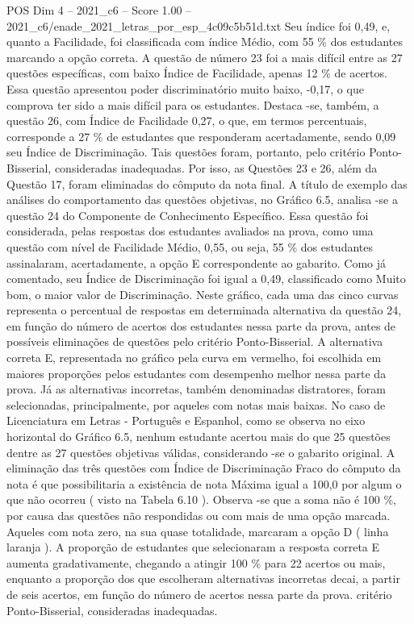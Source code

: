 \begin{textsample}{POS Dim 4 – 2021\_c6 – Score 1.00 – 2021\_c6/enade\_2021\_letras\_por\_esp\_4c09c5b51d.txt}
Seu índice foi 0,49, e, quanto a Facilidade, foi classificada com índice Médio, com 55 \% dos estudantes marcando a opção correta.
A questão de número 23 foi a mais difícil entre as 27 questões específicas, com baixo Índice de Facilidade, apenas 12 \% de acertos.
Essa questão apresentou poder discriminatório muito baixo, -0,17, o que comprova ter sido a mais difícil para os estudantes.
Destaca -se, também, a questão 26, com Índice de Facilidade 0,27, o que, em termos percentuais, corresponde a 27 \% de estudantes que responderam acertadamente, sendo 0,09 seu Índice de Discriminação.
Tais questões foram, portanto, pelo critério Ponto-Bisserial, consideradas inadequadas.
Por isso, as Questões 23 e 26, além da Questão 17, foram eliminadas do cômputo da nota final.
A título de exemplo das análises do comportamento das questões objetivas, no Gráfico 6.5, analisa -se a questão 24 do Componente de Conhecimento Específico.
Essa questão foi considerada, pelas respostas dos estudantes avaliados na prova, como uma questão com nível de Facilidade Médio, 0,55, ou seja, 55 \% dos estudantes assinalaram, acertadamente, a opção E correspondente ao gabarito.
Como já comentado, seu Índice de Discriminação foi igual a 0,49, classificado como Muito bom, o maior valor de Discriminação.
Neste gráfico, cada uma das cinco curvas representa o percentual de respostas em determinada alternativa da questão 24, em função do número de acertos dos estudantes nessa parte da prova, antes de possíveis eliminações de questões pelo critério Ponto-Bisserial.
A alternativa correta E, representada no gráfico pela curva em vermelho, foi escolhida em maiores proporções pelos estudantes com desempenho melhor nessa parte da prova.
Já as alternativas incorretas, também denominadas distratores, foram selecionadas, principalmente, por aqueles com notas mais baixas.
No caso de Licenciatura em Letras - Português e Espanhol, como se observa no eixo horizontal do Gráfico 6.5, nenhum estudante acertou mais do que 25 questões dentre as 27 questões objetivas válidas, considerando -se o gabarito original.
A eliminação das três questões com Índice de Discriminação Fraco do cômputo da nota é que possibilitaria a existência de nota Máxima igual a 100,0 por algum o que não ocorreu ( visto na Tabela 6.10 ).
Observa -se que a soma não é 100 \%, por causa das questões não respondidas ou com mais de uma opção marcada.
Aqueles com nota zero, na sua quase totalidade, marcaram a opção D ( linha laranja ).
A proporção de estudantes que selecionaram a resposta correta E aumenta gradativamente, chegando a atingir 100 \% para 22 acertos ou mais, enquanto a proporção dos que escolheram alternativas incorretas decai, a partir de seis acertos, em função do número de acertos nessa parte da prova. critério Ponto-Bisserial, consideradas inadequadas.

\end{textsample}
